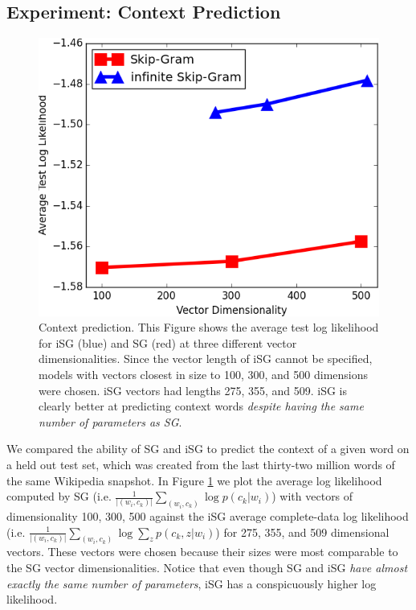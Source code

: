 \documentclass{article} %
\begin{document}
\subsection{Experiment: Context Prediction}
\begin{figure}
  \begin{minipage}[c]{0.30\textwidth}
    \includegraphics[width=.89\linewidth]{prediction_plt.png}
  \end{minipage}\hfill
  \begin{minipage}[c]{0.70\textwidth}
    \caption{Context prediction.  This Figure shows the average test log likelihood for iSG (blue) and SG (red) at three different vector dimensionalities.  Since the vector length of iSG cannot be specified, models with vectors closest in size to 100, 300, and 500 dimensions were chosen.  iSG vectors had lengths 275, 355, and 509.  iSG is clearly better at predicting context words \emph{despite having the same number of parameters as SG}.} \label{pred_plot}
  \end{minipage}
\end{figure}
We compared the ability of SG and iSG to predict the context of a given word on a held out test set, which was created from the last thirty-two million words of the same Wikipedia snapshot.  In Figure \ref{pred_plot} we plot the average log likelihood computed by SG (i.e. $\frac{1}{|(w_{i}, c_{k})|} \sum_{(w_{i}, c_{k})} \log p(c_{k} | w_{i})$) with vectors of dimensionality 100, 300, 500 against the iSG average complete-data log likelihood (i.e. $\frac{1}{|(w_{i}, c_{k})|} \sum_{(w_{i}, c_{k})} \log \sum_{z} p(c_{k}, z | w_{i})$) for 275, 355, and 509 dimensional vectors.  These vectors were chosen because their sizes were most comparable to the SG vector dimensionalities.  Notice that even though SG and iSG \emph{have almost exactly the same number of parameters}, iSG has a conspicuously higher log likelihood. 
\end{document}
